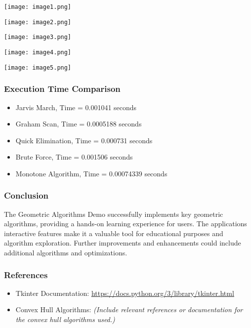 \documentclass[
]{article}
\begin{document}
\texttt{[image: image1.png]}

\texttt{[image: image2.png]}

\texttt{[image: image3.png]}

\texttt{[image: image4.png]}

\texttt{[image: image5.png]}

\subsubsection{Execution Time
Comparison}\label{execution-time-comparison}

\begin{itemize}
\item
  Jarvis March, Time = 0.001041 seconds
\item
  Graham Scan, Time = 0.0005188 seconds
\item
  Quick Elimination, Time = 0.000731 seconds
\item
  Brute Force, Time = 0.001506 seconds
\item
  Monotone Algorithm, Time = 0.00074339 seconds
\end{itemize}

\subsubsection{Conclusion}\label{conclusion}

The Geometric Algorithms Demo successfully implements key geometric
algorithms, providing a hands-on learning experience for users. The
application\textquotesingle s interactive features make it a valuable
tool for educational purposes and algorithm exploration. Further
improvements and enhancements could include additional algorithms and
optimizations.

\subsubsection{References}\label{references}

\begin{itemize}
\item
  Tkinter Documentation:
  \href{https://docs.python.org/3/library/tkinter.html}{\ul{https://docs.python.org/3/library/tkinter.html}}
\item
  Convex Hull Algorithms: \emph{(Include relevant references or
  documentation for the convex hull algorithms used.)}
\end{itemize}
\end{document}
